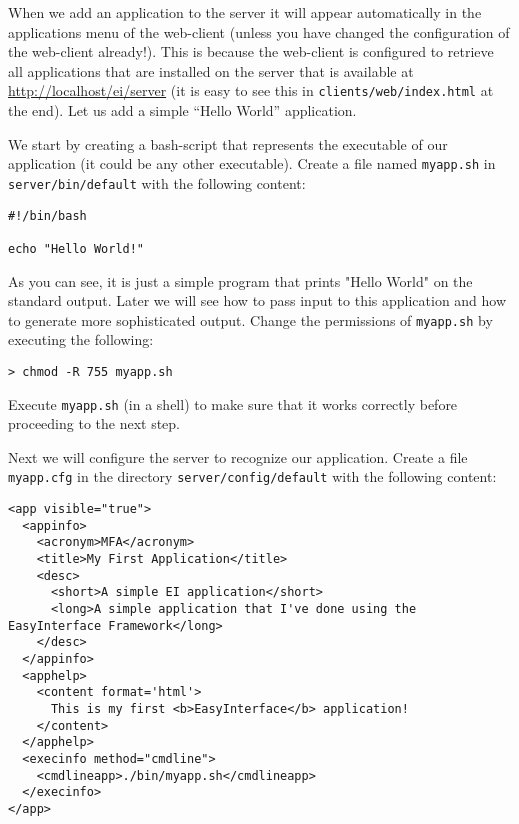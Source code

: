 When we add an application to the \ei server it will appear
automatically in the applications menu of the web-client (unless you
have changed the configuration of the web-client already!).
%
This is because the web-client is configured to retrieve all
applications that are installed on the server that is available at
\url{http://localhost/ei/server} (it is easy to see this in
\texttt{clients/web/index.html} at the end). Let us add a simple
``Hello World'' application.


We start by creating a bash-script that represents the executable of
our application (it could be any other executable). Create a file
named \texttt{myapp.sh} in \texttt{server/bin/default} with the
following content:

\medskip
\begin{lstlisting}[style=script]
#!/bin/bash

echo "Hello World!"
\end{lstlisting}

\medskip
\noindent
As you can see, it is just a simple program that prints "Hello World"
on the standard output. Later we will see how to pass input to this
application and how to generate more sophisticated output.
%
Change the permissions of \texttt{myapp.sh} by executing the
following:

\medskip
\begin{lstlisting}
> chmod -R 755 myapp.sh
\end{lstlisting}

\medskip
\noindent
Execute \texttt{myapp.sh} (in a shell) to make sure that it works
correctly before proceeding to the next step.

Next we will configure the server to recognize our application.
%
Create a file \texttt{myapp.cfg} in the directory
\texttt{server/config/default} with the following content:

\medskip
\begin{lstlisting}
<app visible="true">
  <appinfo>
    <acronym>MFA</acronym>
    <title>My First Application</title>
    <desc>
      <short>A simple EI application</short>
      <long>A simple application that I've done using the EasyInterface Framework</long>
    </desc>
  </appinfo>
  <apphelp>
    <content format='html'>
      This is my first <b>EasyInterface</b> application!
    </content>
  </apphelp>
  <execinfo method="cmdline">
    <cmdlineapp>./bin/myapp.sh</cmdlineapp>
  </execinfo>
</app>
\end{lstlisting}

